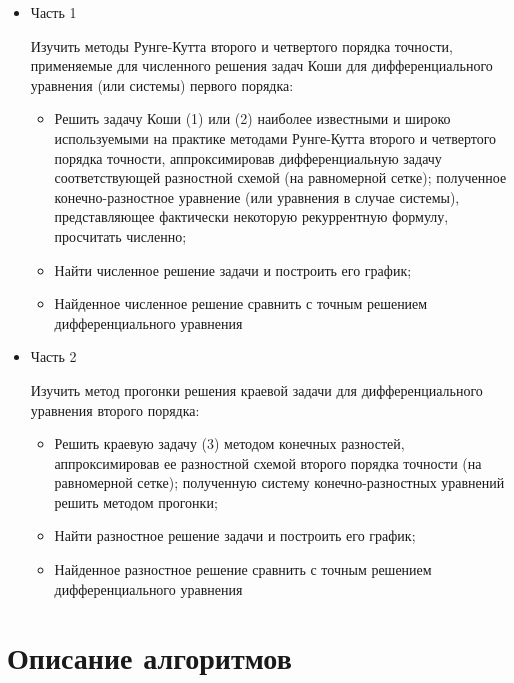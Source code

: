 \documentclass[a4paper,12pt,titlepage,finall]{article}
\begin{document}
\begin{itemize}

\item Часть 1

Изучить методы Рунге-Кутта второго и четвертого порядка точности, применяемые для численного решения задач Коши для дифференциального уравнения (или системы) первого порядка:

\begin{itemize}
\item Решить задачу Коши (1) или (2) наиболее известными и широко используемыми на практике методами Рунге-Кутта второго и четвертого порядка точности, аппроксимировав дифференциальную задачу соответствующей разностной схемой (на равномерной сетке); полученное конечно-разностное уравнение (или уравнения в случае системы), представляющее фактически некоторую рекуррентную формулу, просчитать численно;

\item Найти численное решение задачи и построить его график;

\item Найденное численное решение сравнить с точным решением дифференциального уравнения

\end{itemize}

\item Часть 2

Изучить метод прогонки решения краевой задачи для дифференциального уравнения второго порядка:

\begin{itemize}
\item Решить краевую задачу (3) методом конечных разностей, аппроксимировав ее разностной схемой второго порядка точности (на равномерной сетке); полученную систему конечно-разностных уравнений решить методом прогонки;

\item Найти разностное решение задачи и построить его график;

\item Найденное разностное решение сравнить с точным решением дифференциального уравнения
\end{itemize}

\end{itemize}

\newpage


\section{Описание алгоритмов}
\end{document}
